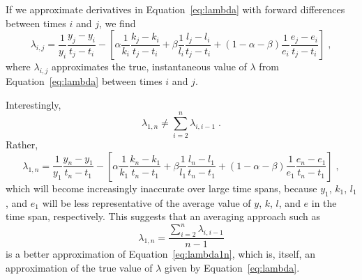 \documentclass[preprint,authoryear,12pt]{elsarticle}\usepackage[]{graphicx}\usepackage[]{color}
\begin{document}
If we approximate derivatives in Equation~\ref{eq:lambda} with forward differences
between times $i$ and $j$, we find
%
\begin{equation} \label{eq:lambdaij}
  \lambda_{i,j}
    = \frac{1}{y_i}\frac{y_j - y_i}{t_j - t_i} 
    - \left[
            \alpha \frac{1}{k_i}\frac{k_j - k_i}{t_j - t_i} 
            + \beta \frac{1}{l_i}\frac{l_j - l_i}{t_j - t_i} 
            + (1 - \alpha - \beta) \frac{1}{e_i}\frac{e_j - e_i}{t_j - t_i} 
      \right] \;,
\end{equation}
% 
where $\lambda_{i,j}$ approximates the true, instantaneous value of $\lambda$
from Equation~\ref{eq:lambda} between times $i$ and $j$.

Interestingly, 
%
\begin{equation}
  \lambda_{1,n}
    \neq \sum_{i=2}^{n} \lambda_{i,i-1}  \;.
\end{equation}
% 
Rather,
%
\begin{equation} \label{eq:lambda1n}
  \lambda_{1,n}
    = \frac{1}{y_1}\frac{y_n - y_1}{t_n - t_1} 
      - \left[ 
            \alpha \frac{1}{k_1}\frac{k_n - k_1}{t_n - t_1} 
            + \beta \frac{1}{l_1}\frac{l_n - l_1}{t_n - t_1} 
            + (1 - \alpha - \beta) \frac{1}{e_1}\frac{e_n - e_1}{t_n - t_1} 
      \right] \; ,
\end{equation}
% 
which will become increasingly inaccurate over large time spans,
because $y_1$, $k_1$, $l_1$, and $e_1$ will be less representative
of the average value of $y$, $k$, $l$, and $e$ in the time span, respectively.
This suggests that an averaging approach such as
%
\begin{equation}
  \lambda_{1,n}
    = \frac{\sum_{i=2}^{n} \lambda_{i,i-1}}{n-1}
\end{equation}
%
is a better approximation of Equation~\ref{eq:lambda1n},
which is, itself, an approximation of the true value of $\lambda$ 
given by Equation~\ref{eq:lambda}.
\end{document}
